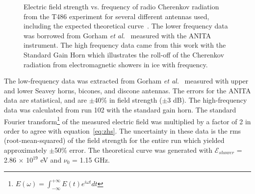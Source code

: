 \begin{figure}[htbp]
\centering
\epsfxsize=5.2in
\caption{Electric field strength vs. frequency of radio Cherenkov radiation from the T486 experiment for several different antennas used, including the expected theoretical curve~\cite{Zas.1992, Alvarez.2000}.  The lower frequency data was borrowed from Gor\-ham \textit{et al.}~\cite{ANITA.2007} measured with the ANITA instrument.  The high frequency data came from this work with the Standard Gain Horn which illustrates the roll-off of the Cherenkov radiation from electromagnetic showers in ice with frequency.}
\label{fig:fieldVsFreq}
\end{figure}

\noindent The low-frequency data was extracted from Gorham \textit{et al.}~\cite{ANITA.2007} measured with upper and lower Seavey horns, bicones, and discone antennas.  The errors for the ANITA data are statistical, and are $\pm$40\% in field strength ($\pm$3 dB).  The high-frequency data was calculated from run 102 with the standard gain horn.  The standard Fourier transform\footnote{$E(\omega) = \int_{-\infty}^{+\infty} E(t)e^{i \omega t} dt$} of the measured electric field was multiplied by a factor of 2 in order to agree with equation~\ref{eq:zhs}.  The uncertainty in these data is the rms (root-mean-squared) of the field strength for the entire run which yielded approximately $\pm$50\% error.  The theoretical curve was generated with $\mathcal{E}_{shower}$ = 2.86 $\times$ 10$^{19}$ eV and $\nu_0$ = 1.15 GHz.

